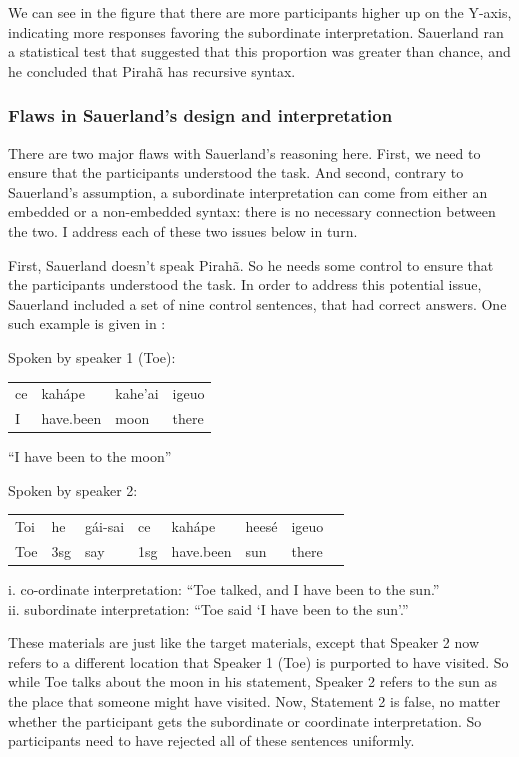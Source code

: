 \documentclass{article}
\begin{document}
We can see in the figure that there are more participants higher up on the Y-axis, indicating more responses favoring the subordinate interpretation. Sauerland ran a statistical test that suggested that this proportion was greater than chance, and he concluded that Pirahã has recursive syntax.

\subsubsection{Flaws in Sauerland's design and interpretation}

There are two major flaws with Sauerland’s reasoning here. First, we need to ensure that the participants understood the task. And second, contrary to Sauerland's assumption, a subordinate interpretation can come from either an embedded or a non-embedded syntax: there is no necessary connection between the two.  I address each of these two issues below in turn.

First, Sauerland doesn't speak Pirahã. So he needs some control to ensure that the participants understood the task. In order to address this potential issue, Sauerland included a set of nine control sentences, that had correct answers.  One such example is given in :

\eal
\label{sauerland_ex_cont}
\ex \label{sauerland_ex1_cont} Spoken by speaker 1 (Toe):\\
\begin{tabular}{l l l l}
ce & kahápe & kahe’ai & igeuo \\ 
I & have.been & moon & there\\
\end{tabular}

``I have been to the moon''

\ex \label{sauerland_ex2_cont} Spoken by speaker 2:\\
\begin{tabular}{l l l l l l l l}
Toi & he & gái-sai & ce & kahápe & heesé & igeuo \\
Toe & 3sg & say & 1sg & have.been & sun & there\\
\end{tabular}

i. co-ordinate interpretation: ``Toe talked, and I have been to the sun.''\\
ii. subordinate interpretation: ``Toe said ‘I have been to the sun’.''
\zl

These materials are just like the target materials, except that Speaker 2 now refers to a different location that Speaker 1 (Toe) is purported to have visited.  So while Toe talks about the moon in his statement, Speaker 2 refers to the sun as the place that someone might have visited.  Now, Statement 2 is false, no matter whether the participant gets the subordinate or coordinate interpretation.  So participants need to have rejected all of these sentences uniformly.
\end{document}
